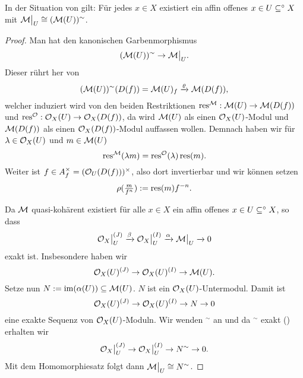 \begin{hilfslemma}
    In der Situation von 
     gilt:
    Für jedes $x \in X$ existiert ein affin offenes $ x \in U\subseteq^\circ X$
    mit $\mathcal{M}\big|_{U} \cong (\mathcal{M}(U))^\sim$.
\end{hilfslemma}
\begin{proof}
    Man hat den kanonischen Garbenmorphismus
    \[ (\mathcal{M}(U))^\sim \to \mathcal{M}\big|_{U}.\]
    Dieser rührt her von
    \[(\mathcal{M}(U))^\sim (D(f)) = \mathcal{M}(U)_f \xrightarrow\varrho \mathcal{M}(D(f)),\]
    welcher induziert wird von den beiden Restriktionen
    $\operatorname{res}^\mathcal{M}: \mathcal{M}(U) \to \mathcal{M}(D(f))$ und
    $\operatorname{res}^\mathcal{O}: \mathcal{O}_X(U) \to \mathcal{O}_X(D(f))$, da 
    wird $\mathcal{M}(U)$ als einen $\mathcal{O}_X(U)$-Modul und $\mathcal{M}(D(f))$ als einen
    $\mathcal{O}_X(D(f))$-Modul auffassen wollen. Demnach haben wir für
    $\lambda \in \mathcal{O}_X(U)$ und $m\in \mathcal{M}(U)$
    \[\operatorname{res}^\mathcal{M}(\lambda m) = \operatorname{res}^\mathcal{O}(\lambda) \operatorname{res}(m).\]
    Weiter ist $f \in A_f^\times = (\mathcal{O}_U(D(f)))^\times$, also 
    dort invertierbar und wir können setzen
    \[\rho(\tfrac{m}{f^n}) := \operatorname{res}(m) f^{-n}.\]
    
    Da $\mathcal{M}$ quasi-kohärent existiert für alle $x \in X$ ein affin offenes
    $x\in U\subseteq^\circ X$, so dass
    \[\mathcal{O}_X\big|_{U}^{(J)} \xrightarrow\beta \mathcal{O}_X\big|_{U}^{(I)} \xrightarrow\alpha 
    \mathcal{M}\big|_{U} \xrightarrow{} 0 \] 
    exakt ist. Insbesondere haben wir
    \[\mathcal{O}_X(U)^{(J)} \to \mathcal{O}_X(U)^{(I)} \to 
    \mathcal{M}(U).\]
    Setze nun $N:= \operatorname{im}(\alpha(U))\subseteq \mathcal{M}(U)$. $N$ ist ein 
    $\mathcal{O}_X(U)$-Untermodul. Damit ist
    \[\mathcal{O}_X(U)^{(J)} \to \mathcal{O}_X(U)^{(I)} \to 
        N \to 0\]
    eine exakte Sequenz von $\mathcal{O}_X(U)$-Moduln. Wir wenden $^\sim$ an 
    und da $^\sim$ exakt () erhalten wir
    \[\mathcal{O}_X\big|_{U}^{(J)} \to \mathcal{O}_X\big|_{U}^{(I)} \to
        N^\sim \to 0.\]
    Mit dem Homomorphiesatz folgt dann $\mathcal{M}\big|_{U} \cong N^\sim$. 
\end{proof}

